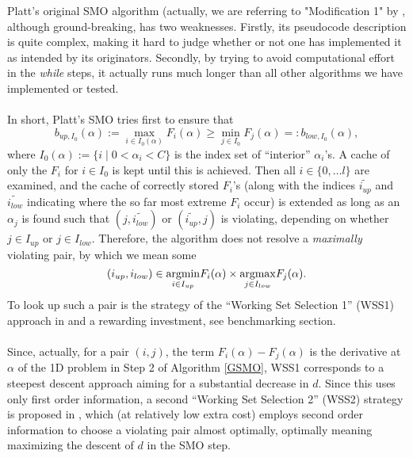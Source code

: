 Platt's original SMO algorithm (actually, we are referring to "Modification 1" by \cite{KeerthiShevade}, although ground-breaking, has two weaknesses. Firstly, its pseudocode description is quite complex, making it hard to judge whether or not one has implemented it as intended by its originators. Secondly, by trying to avoid computational effort in the \textit{while} steps, it actually runs much longer than all other algorithms we have implemented or tested.\\\\
In short, Platt's SMO tries first to ensure that
\[
b_{up,I_0}(\alpha) := \max_{i \in I_0(\alpha)} F_i(\alpha) \geq \min_{j \in I_0} F_j(\alpha) =: b_{low,I_0}(\alpha),
\]
where $I_0(\alpha) := \{ i  \mid  0 < \alpha_i < C \}$ is the index set of ``interior'' $\alpha_i$'s. A cache of only the $F_i$ for $i \in I_0$ is kept until this is achieved. Then all $i \in \{0,\ldots l\}$ are examined, and the cache of correctly stored $F_i$'s (along with the indices $\widetilde{i_{up}}$ and $\widetilde{i_{low}}$ indicating where the so far most extreme $F_i$ occur) is extended as long as an $\alpha_j$ is found such that $(j,\widetilde{i_{low}})$ or $(\widetilde{i_{up}},j)$ is violating, depending on whether $j \in I_{up}$ or $j \in I_{low}$. Therefore, the algorithm does not resolve a \textit{maximally} violating pair, by which we mean some 
\begin{equation*}
(i_{up},i_{low}) \in \underset{i \in I_{up}}{\operatorname{argmin}}F_i(\alpha) \times \underset{j \in I_{low}}{\operatorname{argmax}}F_j(\alpha).
\end{equation*} To look up such a pair is the strategy of the ``Working Set Selection 1'' (WSS1) approach in \cite{FanChenLin} and a rewarding investment, see benchmarking section. \\\\
Since, actually, for a pair $(i,j)$, the term $F_i(\alpha) - F_j(\alpha)$ is the derivative at $\alpha$ of the 1D problem in Step 2 of Algorithm \ref{GSMO}, WSS1 corresponds to a steepest descent approach aiming for a substantial decrease in $d$. Since this uses only first order information, a second ``Working Set Selection 2'' (WSS2) strategy is proposed in \cite{FanChenLin}, which (at relatively low extra cost) employs second order information to choose a violating pair almost optimally, optimally meaning maximizing the descent of $d$ in the SMO step.
